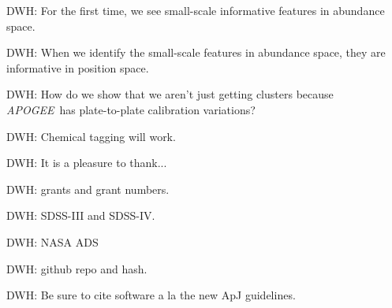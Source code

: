 \documentclass[12pt, letterpaper, preprint]{aastex}
\newcommand{\acronym}[1]{{\small{#1}}}
\newcommand{\project}[1]{\textsl{#1}}
\newcommand{\apogee}{\acronym{\project{APOGEE}}}
\begin{document}
DWH: For the first time, we see small-scale informative features in abundance space.

DWH: When we identify the small-scale features in abundance space, they are informative in position space.

DWH: How do we show that we aren't just getting clusters because \apogee\ has plate-to-plate calibration variations?

DWH: Chemical tagging will work.

\acknowledgements
DWH: It is a pleasure to thank...

DWH: grants and grant numbers.

DWH: SDSS-III and SDSS-IV.

DWH: NASA ADS

DWH: github repo and hash.

DWH: Be sure to cite software a la the new ApJ guidelines.
\end{document}

